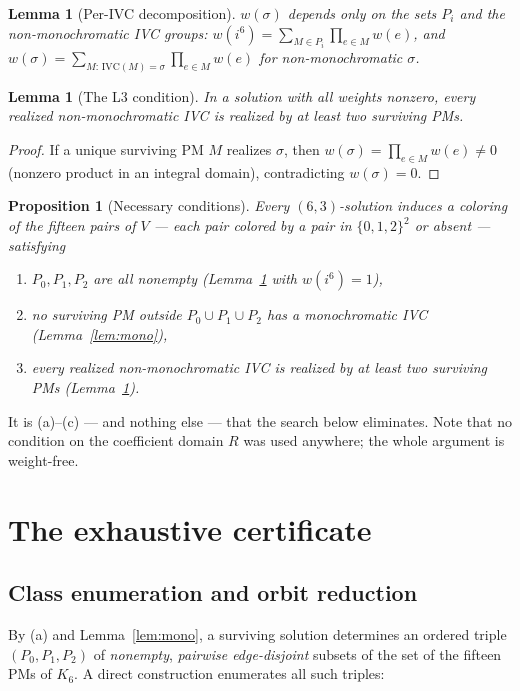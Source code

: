 \documentclass[11pt]{article}
\newtheorem{lemma}[theorem]{Lemma}
\newtheorem{proposition}[theorem]{Proposition}
\theoremstyle{definition}
\begin{document}
\begin{lemma}[Per-IVC decomposition]\label{lem:decomp}
$w(\sigma)$ depends only on the sets $P_i$ and the non-monochromatic
IVC groups: $w(i^6)=\sum_{M\in P_i}\prod_{e\in M}w(e)$, and
$w(\sigma)=\sum_{M:\,\mathrm{IVC}(M)=\sigma}\prod_{e\in M}w(e)$ for
non-monochromatic $\sigma$.
\end{lemma}

\begin{lemma}[The L3 condition]\label{lem:L3}
In a solution with all weights nonzero, every \emph{realized}
non-monochromatic IVC is realized by at least two surviving PMs.
\end{lemma}
\begin{proof}
If a unique surviving PM $M$ realizes $\sigma$, then
$w(\sigma)=\prod_{e\in M}w(e)\neq 0$ (nonzero product in an integral
domain), contradicting $w(\sigma)=0$.
\end{proof}

\begin{proposition}[Necessary conditions]\label{prop:necessary}
Every $(6,3)$-solution induces a coloring of the fifteen pairs of
$V$ --- each pair colored by a pair in $\{0,1,2\}^2$ or absent ---
satisfying
\begin{enumerate}[label=(\alph*)]
\item $P_0,P_1,P_2$ are all nonempty (Lemma~\ref{lem:decomp} with
$w(i^6)=1$),
\item no surviving PM outside $P_0\cup P_1\cup P_2$ has a monochromatic
IVC (Lemma~\ref{lem:mono}),
\item every realized non-monochromatic IVC is realized by at least two
surviving PMs (Lemma~\ref{lem:L3}).
\end{enumerate}
\end{proposition}

It is (a)--(c) --- and nothing else --- that the search below
eliminates. Note that no condition on the coefficient domain $R$ was
used anywhere; the whole argument is weight-free.

\section{The exhaustive certificate}\label{sec:search}

\subsection{Class enumeration and orbit reduction}

By (a) and Lemma~\ref{lem:mono}, a surviving solution determines an
ordered triple $(P_0,P_1,P_2)$ of \emph{nonempty}, \emph{pairwise
edge-disjoint} subsets of the set of the fifteen PMs of $K_6$. A direct
construction enumerates all such triples:
\end{document}
